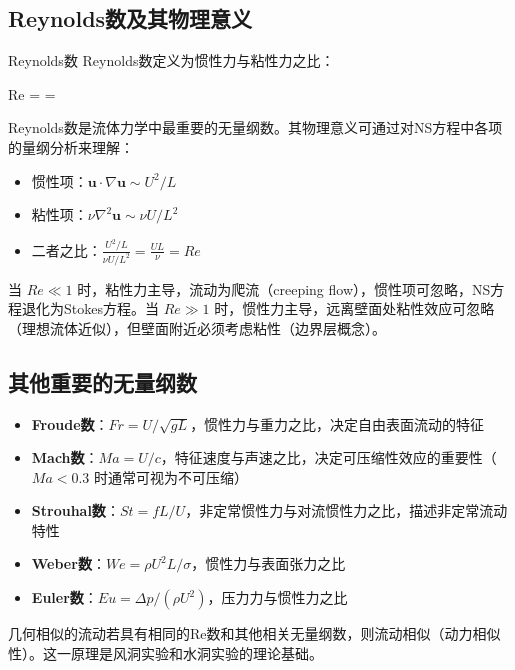 \subsection{Reynolds数及其物理意义}

\begin{mydefinition}{Reynolds数}
Reynolds数定义为惯性力与粘性力之比：
\begin{myformula}
    Re =  = 
\end{myformula}
\end{mydefinition}

Reynolds数是流体力学中最重要的无量纲数。其物理意义可通过对NS方程中各项的量纲分析来理解：

\begin{itemize}
    \item 惯性项：$\mathbf{u}\cdot\nabla\mathbf{u} \sim U^{2}/L$
    \item 粘性项：$\nu\nabla^{2}\mathbf{u} \sim \nu U/L^{2}$
    \item 二者之比：$\frac{U^{2}/L}{\nu U/L^{2}} = \frac{UL}{\nu} = Re$
\end{itemize}

当 $Re \ll 1$ 时，粘性力主导，流动为爬流（creeping flow），惯性项可忽略，NS方程退化为Stokes方程。当 $Re \gg 1$ 时，惯性力主导，远离壁面处粘性效应可忽略（理想流体近似），但壁面附近必须考虑粘性（边界层概念）。

\subsection{其他重要的无量纲数}

\begin{itemize}
    \item \textbf{Froude数}：$Fr = U/\sqrt{gL}$，惯性力与重力之比，决定自由表面流动的特征
    \item \textbf{Mach数}：$Ma = U/c$，特征速度与声速之比，决定可压缩性效应的重要性（$Ma < 0.3$ 时通常可视为不可压缩）
    \item \textbf{Strouhal数}：$St = fL/U$，非定常惯性力与对流惯性力之比，描述非定常流动特性
    \item \textbf{Weber数}：$We = \rho U^{2}L/\sigma$，惯性力与表面张力之比
    \item \textbf{Euler数}：$Eu = \Delta p/(\rho U^{2})$，压力力与惯性力之比
\end{itemize}

\begin{remark}
几何相似的流动若具有相同的Re数和其他相关无量纲数，则流动相似（动力相似性）。这一原理是风洞实验和水洞实验的理论基础。
\end{remark}

